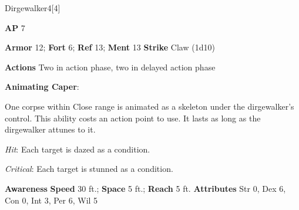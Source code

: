 \begin{monsection}{Dirgewalker}{4}[4]
\vspace{-1em}\vspace{-1em}
\begin{spellcontent}
\begin{spelltargetinginfo}
{\textbf{AP} 7}

\pari \textbf{Armor} 12;
\textbf{Fort} 6;
\textbf{Ref} 13;
\textbf{Ment} 13
\pari \textbf{Strike} Claw  (1d10)


\pari \textbf{Actions} Two in action phase, two in delayed action phase
\end{spelltargetinginfo}


\begin{spelleffects}

\pari
\textbf{Animating Caper}:

One corpse within Close range is animated as a skeleton under the dirgewalker's control.
This ability costs an action point to use.
It lasts as long as the dirgewalker attunes to it.




\vspace{0.5em}
\pari

\par


\par \textit{Hit}: Each target is dazed as a condition.
\par \textit{Critical}: Each target is stunned as a condition.

\end{spelleffects}

\end{spellcontent}

\begin{monsterfooter}
\pari \textbf{Awareness} 
\pari \textbf{Speed} 30 ft.;
\textbf{Space} 5 ft.;
\textbf{Reach} 5 ft.
\pari \textbf{Attributes}
Str 0,
Dex 6,
Con 0,
Int 3,
Per 6,
Wil 5
\end{monsterfooter}
\end{monsection}



